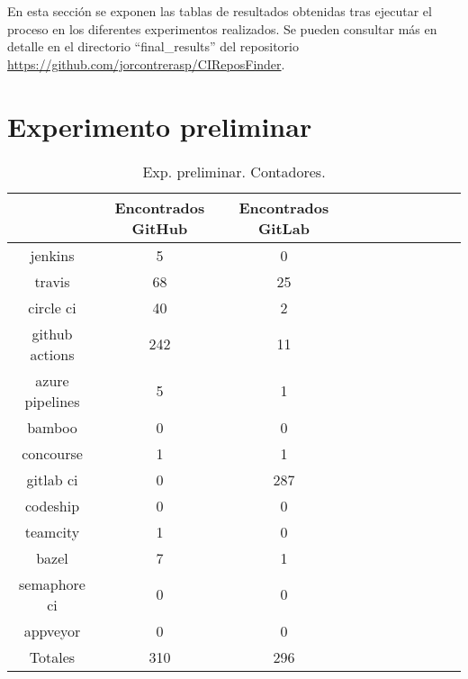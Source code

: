 En esta sección se exponen las tablas de resultados obtenidas tras ejecutar el proceso en los diferentes experimentos realizados. Se pueden consultar más en detalle en el directorio ``final\_results'' del repositorio \url{https://github.com/jorcontrerasp/CIReposFinder}.

\newpage

\section{Experimento preliminar}

\begin{table}[h!]
  \centering
  \caption{Exp. preliminar. Contadores.}
  \label{tab:tabla_p1}

\begin{footnotesize}
\renewcommand{\arraystretch}{1.5} %
\begin{tabular}{ccccccccccc}
  \hline
  {} &  Encontrados GitHub &  Encontrados GitLab \\
  \hline
  jenkins         &                   5 &                   0 \\
  travis          &                  68 &                  25 \\
  circle ci       &                  40 &                   2 \\
  github actions  &                 242 &                  11 \\
  azure pipelines &                   5 &                   1 \\
  bamboo          &                   0 &                   0 \\
  concourse       &                   1 &                   1 \\
  gitlab ci       &                   0 &                 287 \\
  codeship        &                   0 &                   0 \\
  teamcity        &                   1 &                   0 \\
  bazel           &                   7 &                   1 \\
  semaphore ci    &                   0 &                   0 \\
  appveyor        &                   0 &                   0 \\
  \hline
  Totales         &                 310 &                 296 \\
 \end{tabular}
\end{footnotesize}

\end{table}

